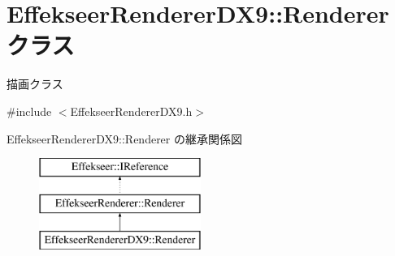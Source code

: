 \hypertarget{class_effekseer_renderer_d_x9_1_1_renderer}{}\section{Effekseer\+Renderer\+D\+X9\+:\+:Renderer クラス}
\label{class_effekseer_renderer_d_x9_1_1_renderer}


描画クラス  




{\ttfamily \#include $<$Effekseer\+Renderer\+D\+X9.\+h$>$}

Effekseer\+Renderer\+D\+X9\+:\+:Renderer の継承関係図\begin{figure}[H]
\begin{center}
\leavevmode
\includegraphics[height=3.000000cm]{class_effekseer_renderer_d_x9_1_1_renderer}
\end{center}
\end{figure}
